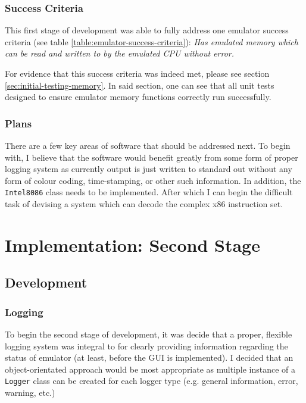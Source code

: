     \subsubsection{Success Criteria}
        This first stage of development was able to fully address one emulator success criteria (see table \ref{table:emulator-success-criteria}): \textit{Has emulated memory which can be read and written to by the emulated CPU without error.}

        For evidence that this success criteria was indeed met, please see section \ref{sec:initial-testing-memory}. In said section, one can see that all unit tests designed to ensure emulator memory functions correctly run successfully.

    \subsubsection{Plans}
        There are a few key areas of software that should be addressed next. To begin with, I believe that the software would benefit greatly from some form of proper logging system as currently output is just written to standard out without any form of colour coding, time-stamping, or other such information. In addition, the \texttt{Intel8086} class needs to be implemented. After which I can begin the difficult task of devising a system which can decode the complex x86 instruction set.



\section{Implementation: Second Stage} %

\subsection{Development}
    \subsubsection{Logging}
        To begin the second stage of development, it was decide that a proper, flexible logging system was integral to for clearly providing information regarding the status of emulator (at least, before the GUI is implemented). I decided that an object-orientated approach would be most appropriate as multiple instance of a \texttt{Logger} class can be created for each logger type (e.g. general information, error, warning, etc.)

